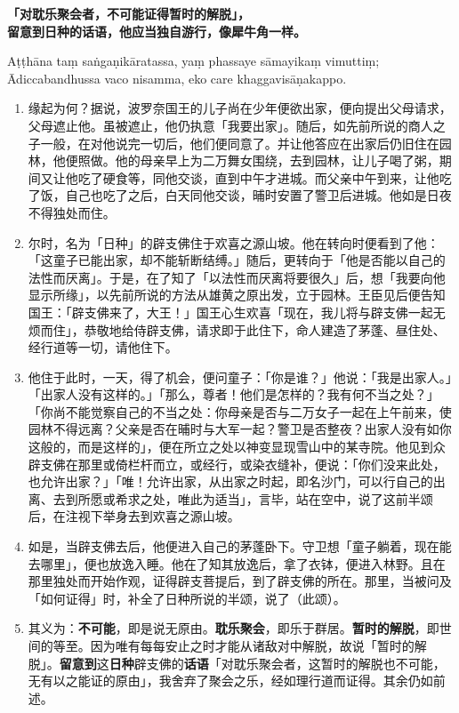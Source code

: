\textbf{「对耽乐聚会者，不可能证得暂时的解脱」，\\}
\textbf{留意到日种的话语，他应当独自游行，像犀牛角一样。}

Aṭṭhāna taṃ saṅgaṇikāratassa, yaṃ phassaye sāmayikaṃ vimuttiṃ;\\
Ādiccabandhussa vaco nisamma, eko care khaggavisāṇakappo. %

\begin{enumerate}\item 缘起为何？据说，波罗奈国王的儿子尚在少年便欲出家，便向提出父母请求，父母遮止他。虽被遮止，他仍执意「我要出家」。随后，如先前所说的商人之子一般，在对他说完一切后，他们便同意了。并让他答应在出家后仍旧住在园林，他便照做。他的母亲早上为二万舞女围绕，去到园林，让儿子喝了粥，期间又让他吃了硬食等，同他交谈，直到中午才进城。而父亲中午到来，让他吃了饭，自己也吃了之后，白天同他交谈，晡时安置了警卫后进城。他如是日夜不得独处而住。
\item 尔时，名为「日种」的辟支佛住于欢喜之源山坡。他在转向时便看到了他：「这童子已能出家，却不能斩断结缚。」随后，更转向于「他是否能以自己的法性而厌离」。于是，在了知了「以法性而厌离将要很久」后，想「我要向他显示所缘」，以先前所说的方法从雄黄之原出发，立于园林。王臣见后便告知国王：「辟支佛来了，大王！」国王心生欢喜「现在，我儿将与辟支佛一起无烦而住」，恭敬地给侍辟支佛，请求即于此住下，命人建造了茅蓬、昼住处、经行道等一切，请他住下。
\item 他住于此时，一天，得了机会，便问童子：「你是谁？」他说：「我是出家人。」「出家人没有这样的。」「那么，尊者！他们是怎样的？我有何不当之处？」「你尚不能觉察自己的不当之处：你母亲是否与二万女子一起在上午前来，使园林不得远离？父亲是否在晡时与大军一起？警卫是否整夜？出家人没有如你这般的，而是这样的」，便在所立之处以神变显现雪山中的某寺院。他见到众辟支佛在那里或倚栏杆而立，或经行，或染衣缝补，便说：「你们没来此处，也允许出家？」「唯！允许出家，从出家之时起，即名沙门，可以行自己的出离、去到所愿或希求之处，唯此为适当」，言毕，站在空中，说了这前半颂后，在注视下举身去到欢喜之源山坡。
\item 如是，当辟支佛去后，他便进入自己的茅蓬卧下。守卫想「童子躺着，现在能去哪里」，便也放逸入睡。他在了知其放逸后，拿了衣钵，便进入林野。且在那里独处而开始作观，证得辟支菩提后，到了辟支佛的所在。那里，当被问及「如何证得」时，补全了日种所说的半颂，说了（此颂）。
\item 其义为：\textbf{不可能}，即是说无原由。\textbf{耽乐聚会}，即乐于群居。\textbf{暂时的解脱}，即世间的等至。因为唯有每每安止之时才能从诸敌对中解脱，故说「暂时的解脱」。\textbf{留意到}这\textbf{日种}辟支佛的\textbf{话语}「对耽乐聚会者，这暂时的解脱也不可能，无有以之能证的原由」，我舍弃了聚会之乐，经如理行道而证得。其余仍如前述。\end{enumerate}

